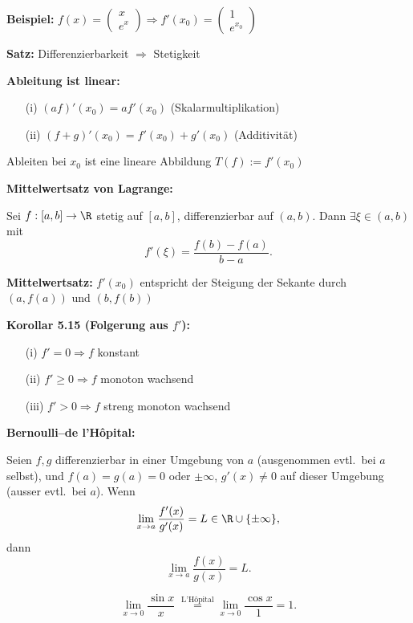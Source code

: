 \textbf{Beispiel:} \(f(x) = \begin{pmatrix} x \\ e^x \end{pmatrix} \Rightarrow f'(x_0) = \begin{pmatrix} 1 \\ e^{x_0} \end{pmatrix}\)

\textbf{Satz:}  
Differenzierbarkeit \(\Rightarrow\) Stetigkeit

\textbf{Ableitung ist linear:}
\begin{itemize}
  \item[(i)] \( (a f)'(x_0) = a f'(x_0) \) \quad (Skalarmultiplikation)
  \item[(ii)] \( (f + g)'(x_0) = f'(x_0) + g'(x_0) \) \quad (Additivität)
\end{itemize}
Ableiten bei \(x_0\) ist eine lineare Abbildung \(T(f) := f'(x_0)\)

\textbf{Mittelwertsatz von Lagrange:}
\begin{theorem}
  Sei $f:[a,b]\to\R$ stetig auf $[a,b]$, differenzierbar auf $(a,b)$. Dann $\exists\xi\in(a,b)$ mit
  \[
    f'(\xi) = \frac{f(b)-f(a)}{b-a}.
  \]
\end{theorem}

\textbf{Mittelwertsatz:}  
\(f'(x_0)\) entspricht der Steigung der Sekante durch \((a, f(a))\) und \((b, f(b))\)

\textbf{Korollar 5.15 (Folgerung aus \(f'\)):}
\begin{itemize}
  \item[(i)] \(f' = 0 \Rightarrow f\) konstant
  \item[(ii)] \(f' \ge 0 \Rightarrow f\) monoton wachsend
  \item[(iii)] \(f' > 0 \Rightarrow f\) streng monoton wachsend
\end{itemize}


\textbf{Bernoulli–de l’Hôpital:}
\begin{theorem}
  Seien $f,g$ differenzierbar in einer Umgebung von $a$ (ausgenommen evtl.\ bei $a$ selbst), und $f(a)=g(a)=0$ oder $\pm\infty$, $g'(x)\ne0$ auf dieser Umgebung (ausser evtl.\ bei $a$). Wenn
  \[
    \lim_{x\to a} \frac{f'(x)}{g'(x)} = L \in \R \cup \{\pm\infty\},
  \]
  dann
  \[
    \lim_{x\to a} \frac{f(x)}{g(x)} = L.
  \]
\end{theorem}
\begin{example}
  \[
    \lim_{x\to0} \frac{\sin x}{x} 
    \;\stackrel{\text{L'Hôpital}}= 
    \lim_{x\to0} \frac{\cos x}{1} = 1.
  \]
\end{example}

